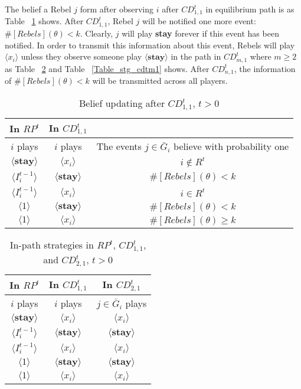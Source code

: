 \documentclass[12pt,letter]{article}
\theoremstyle{definition}
\theoremstyle{remark}
\theoremstyle{claim}
\begin{document}
The belief a Rebel $j$ form after observing $i$ after $CD^t_{1,1}$ in equilibrium path is as Table ~\ref{Table_blf_up_cdt11} shows. After $CD^t_{1,1}$, Rebel $j$ will be notified one more event: $\#[Rebels](\theta)< k$. Clearly, $j$ will play \textbf{stay} forever if this event has been notified. In order to transmit this information about this event, Rebels will play $\langle x_i \rangle$ unless they observe someone play $\langle \textbf{stay} \rangle$ in the path in $CD^t_{m,1}$ where $m\geq 2$ as Table ~\ref{Table_stg_cdt21} and Table ~\ref{Table_stg_cdtm1} shows. After $CD^t_{n,1}$, the information of $\#[Rebels](\theta)< k$ will be transmitted across all players. 
\begin{table}[ht]
\caption{Belief updating after $CD^t_{1,1}$, $t>0$}
\label{Table_blf_up_cdt11}
\begin{center}
\begin{tabular}{c c c}
In $RP^t$ 	&  	In $CD^t_{1,1}$		&  \\
\hline
\hline
$i$ plays 		&  	$i$ plays		& The events $j\in \bar{G}_i$ believe with probability one  \\
\hline
$\langle  \textbf{stay} \rangle$ 	& 	$\langle x_i \rangle$	    & $i\notin R^t$ \\
$\langle  {I^{t-1}_i} \rangle$ 		&  $\langle \textbf{stay} \rangle$		& $\#[Rebels](\theta)< k$     \\
$\langle  {I^{t-1}_i} \rangle$ 		&  $\langle x_i \rangle$		& $i\in R^t$     \\
$\langle 1 \rangle$ 		             &  $\langle \textbf{stay} \rangle$		& $\#[Rebels](\theta)< k$  \\
$\langle 1 \rangle$ 		             &  $\langle x_i \rangle$		&  $\#[Rebels](\theta)\geq k$ 
\end{tabular}
\end{center}
\end{table}



\begin{table}[ht]
\caption{In-path strategies in $RP^t$, $CD^t_{1,1}$, and $CD^t_{2,1}$, $t>0$}
\label{Table_stg_cdt21}
\begin{center}
\begin{tabular}{c c c}
In $RP^t$ 	 	&  	In $CD^t_{1,1}$		&  In $CD^t_{2,1}$	\\
\hline
\hline
$i$ plays 		  							&  	$i$ plays									& $j\in \bar{G}_{i}$ plays  \\
\hline
$\langle  \textbf{stay} \rangle$ 	& 	$\langle x_i \rangle$	    & $\langle x_i \rangle$ \\
$\langle  {I^{t-1}_i} \rangle$ 		&  $\langle \textbf{stay} \rangle$		& $\langle \textbf{stay} \rangle$     \\
$\langle  {I^{t-1}_i} \rangle$ 		&  $\langle x_i \rangle$		& $\langle x_i \rangle$     \\
$\langle 1 \rangle$ 		             &  $\langle \textbf{stay} \rangle$		& $\langle \textbf{stay} \rangle$  \\
$\langle 1 \rangle$ 		             &  $\langle x_i \rangle$		&  $\langle x_i \rangle$  
\end{tabular}
\end{center}
\end{table}
\end{document}
